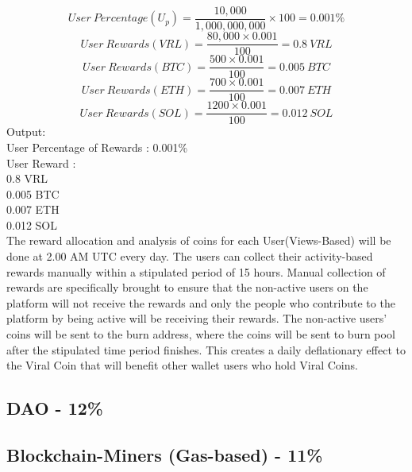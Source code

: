 \documentclass[10pt]{article}
\begin{document}
\begin{equation}
User\:Percentage(U_p)=\frac{10,000}{1,000,000,000} \times 100 = 0.001\%
\end{equation}
\begin{equation}
User\:Rewards(VRL)=\frac{80,000 \times 0.001}{100} = 0.8\:VRL
\end{equation}
\begin{equation}
User\:Rewards(BTC)=\frac{500 \times 0.001}{100} = 0.005\:BTC
\end{equation}
\begin{equation}
User\:Rewards(ETH)=\frac{700 \times 0.001}{100} = 0.007\:ETH
\end{equation}
\begin{equation}
User\:Rewards(SOL)=\frac{1200 \times 0.001}{100} = 0.012\:SOL
\end{equation}
Output:\\

User Percentage of Rewards : 0.001\%\\
User Reward : \\
0.8 VRL \\
0.005 BTC \\
0.007 ETH \\
0.012 SOL\\


The reward allocation and analysis of coins for each User(Views-Based) will be done at 2.00 AM UTC every day. The users can collect their activity-based rewards manually within a stipulated period of 15 hours. Manual collection of rewards are specifically brought to ensure that the non-active users on the platform will not receive the rewards and only the people who contribute to the platform by being active will be receiving their rewards. The non-active users' coins will be sent to the burn address, where the coins will be sent to burn pool after the stipulated time period finishes. This creates a daily deflationary effect to the Viral Coin that will benefit other wallet users who hold Viral Coins.\\

\subsection{DAO - 12\%}

\subsection{Blockchain-Miners (Gas-based) - 11\%}
\end{document}
